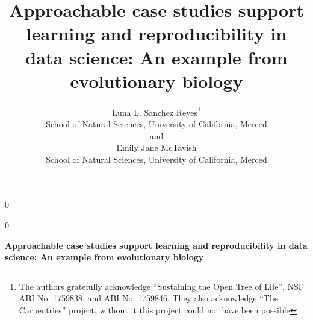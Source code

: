 \documentclass[12pt]{article}
\newcommand{\blind}{0}
\begin{document}
%
%


\def\spacingset#1{\renewcommand{\baselinestretch}%
{#1}\small\normalsize} \spacingset{1}



\blind
{
  \title{\bf Approachable case studies support learning and reproducibility in data science: An example from evolutionary biology}
  \author{Luna L. Sanchez Reyes\thanks{
    The authors gratefully acknowledge ``Sustaining the Open Tree of Life'',
    NSF ABI No. 1759838, and ABI No. 1759846. They also acknowledge ``The Carpentries''
    project, without it this project could not have been possible}\hspace{.2cm}\\
    School of Natural Sciences, University of California, Merced\\
    and \\
    Emily Jane McTavish \\
    School of Natural Sciences, University of California, Merced}
  \maketitle
} \fi

\blind
{
  \bigskip
  \bigskip
  \bigskip
  \begin{center}
    {\LARGE\bf Approachable case studies support learning and reproducibility in data science: An example from evolutionary biology}
\end{center}
  \medskip
} \fi
\end{document}
